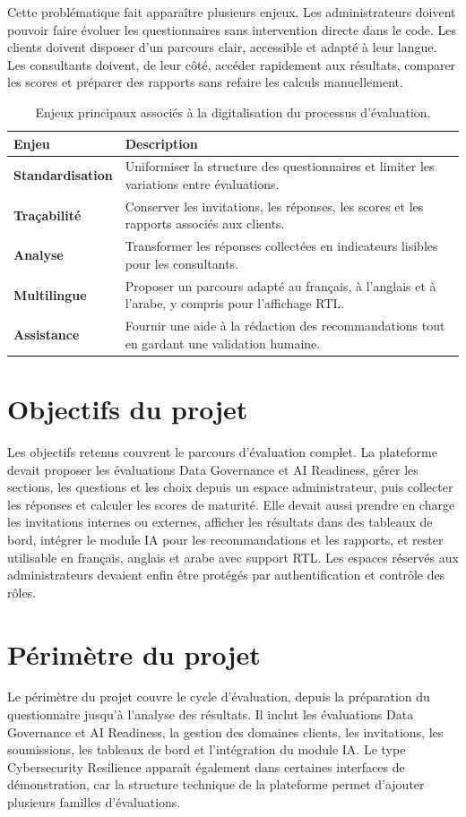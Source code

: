 \documentclass[12pt,a4paper]{report}
\begin{document}
Cette problématique fait apparaître plusieurs enjeux. Les administrateurs doivent pouvoir faire évoluer les questionnaires sans intervention directe dans le code. Les clients doivent disposer d'un parcours clair, accessible et adapté à leur langue. Les consultants doivent, de leur côté, accéder rapidement aux résultats, comparer les scores et préparer des rapports sans refaire les calculs manuellement.

\begin{table}[H]
\centering
\caption{Enjeux principaux associés à la digitalisation du processus d'évaluation.}
\begin{tabularx}{\textwidth}{>{\bfseries}L{3.5cm}Y}
\toprule
Enjeu & Description \\
\midrule
Standardisation & Uniformiser la structure des questionnaires et limiter les variations entre évaluations. \\
Traçabilité & Conserver les invitations, les réponses, les scores et les rapports associés aux clients. \\
Analyse & Transformer les réponses collectées en indicateurs lisibles pour les consultants. \\
Multilingue & Proposer un parcours adapté au français, à l'anglais et à l'arabe, y compris pour l'affichage RTL. \\
Assistance & Fournir une aide à la rédaction des recommandations tout en gardant une validation humaine. \\
\bottomrule
\end{tabularx}
\end{table}

\section{Objectifs du projet}
Les objectifs retenus couvrent le parcours d'évaluation complet. La plateforme devait proposer les évaluations Data Governance et AI Readiness, gérer les sections, les questions et les choix depuis un espace administrateur, puis collecter les réponses et calculer les scores de maturité. Elle devait aussi prendre en charge les invitations internes ou externes, afficher les résultats dans des tableaux de bord, intégrer le module IA pour les recommandations et les rapports, et rester utilisable en français, anglais et arabe avec support RTL. Les espaces réservés aux administrateurs devaient enfin être protégés par authentification et contrôle des rôles.

\section{Périmètre du projet}
Le périmètre du projet couvre le cycle d'évaluation, depuis la préparation du questionnaire jusqu'à l'analyse des résultats. Il inclut les évaluations Data Governance et AI Readiness, la gestion des domaines clients, les invitations, les soumissions, les tableaux de bord et l'intégration du module IA. Le type Cybersecurity Resilience apparaît également dans certaines interfaces de démonstration, car la structure technique de la plateforme permet d'ajouter plusieurs familles d'évaluations.
\end{document}
